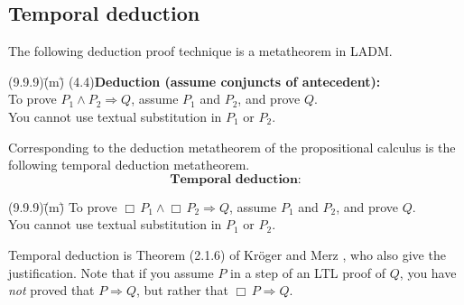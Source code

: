 \documentclass[12pt, fleqn, leqno]{article}
\newcommand{\lgap}{2pt}                             %
\newcommand{\mymathindent}{24pt}                    %
\newcommand{\impl}{\ensuremath{\Rightarrow}}        %
\newcommand{\Always}{\Box\,}
\newcommand{\myqed}{\rule[-.23ex]{1.2ex}{2.0ex}}
\newcommand{\myqedtab}{\hspace{384pt}}              %
\newcommand{\Gll} {\langle}                         %
\newcommand{\Ggg} {\rangle}                         %
\newcommand{\Hint}[1]     {\ \ \ $\Gll              \mbox{#1} \Ggg$ }   %
\begin{document}
\subsection{Temporal deduction}

The following deduction proof technique is a metatheorem in LADM.
\begin{tabbing}
(9.9.9)\;\=(m)\;\=\kill
(4.4)\>\textbf{Deduction (assume conjuncts of antecedent):}\\[\lgap]
      \>To prove $P_{1}\land P_{2}\impl Q$, assume $P_{1}$ and $P_{2}$, and prove $Q$.\\[\lgap]
      \>You cannot use textual substitution in $P_{1}$ or $P_{2}$.
\end{tabbing}
Corresponding to the deduction metatheorem of the propositional calculus is the following temporal deduction metatheorem.
\begin{equation}\label{E:metaDeduction}
\textbf{Temporal deduction:}
\end{equation}
\begin{tabbing}
(9.9.9)\;\=(m)\;\=\kill
      \>To prove $\Always P_{1}\land \Always P_{2}\impl Q$, assume $P_{1}$ and $P_{2}$, and prove $Q$.\\[\lgap]
      \>You cannot use textual substitution in $P_{1}$ or $P_{2}$.
\end{tabbing}

Temporal deduction is Theorem (2.1.6) of Kröger and Merz \cite{Kroger}, who also give the justification.
Note that if you assume $P$ in a step of an LTL proof of $Q$, you have \textit{not} proved that $P\impl Q$, but rather that $\Always P \impl Q$.

\end{document}
